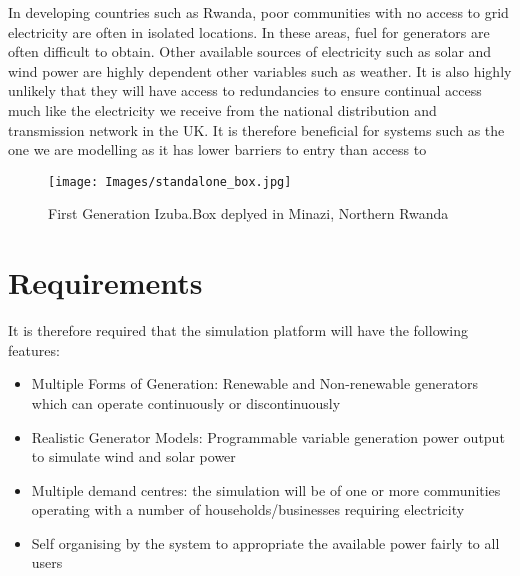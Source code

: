 \documentclass{article}
\begin{document}
In developing countries such as Rwanda, poor communities with no access to grid electricity are often in isolated locations. In these areas, fuel for generators are often difficult to obtain. Other available sources of electricity such as solar and wind power are highly dependent other variables such as weather. It is also highly unlikely that they will have access to redundancies to ensure continual access much like the electricity we receive from the national distribution and transmission network in the UK. It is therefore beneficial for systems such as the one we are modelling as it has lower barriers to entry than access to 

\begin{figure}[h!]
\centering
\texttt{[image: Images/standalone\_box.jpg]}
\caption{First Generation Izuba.Box deplyed in Minazi, Northern Rwanda}
\label{fig:IzubaBox}
\end{figure}




\section{Requirements}


It is therefore required that the simulation platform will have the following features:
\begin{itemize}
  \item Multiple Forms of Generation: Renewable and Non-renewable generators which can operate continuously or discontinuously
  \item Realistic Generator Models: Programmable variable generation power output to simulate wind and solar power
  \item Multiple demand centres: the simulation will be of one or more communities operating with a number of households/businesses requiring electricity
  \item Self organising by the system to appropriate the available power fairly to all users
\end{itemize}
\end{document}
